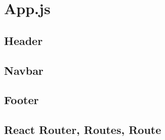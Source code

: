 \section{App.js}
\label{appDatei}

\subsection{Header}
\subsection{Navbar}
\subsection{Footer}

\subsection{React Router, Routes, Route}
